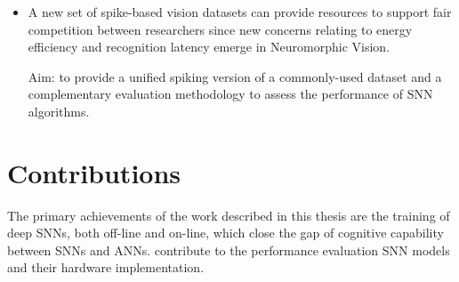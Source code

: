 \begin{itemize}
	\item 
	A new set of spike-based vision datasets can provide resources to support fair competition between researchers since new concerns relating to energy efficiency and recognition latency emerge in Neuromorphic Vision.

	Aim: to provide a unified spiking version of a commonly-used dataset and a complementary evaluation methodology to assess the performance of SNN algorithms.
\end{itemize}


\section{Contributions}
The primary achievements of the work described in this thesis are the training of deep SNNs, both off-line and on-line, which close the gap of cognitive capability between SNNs and ANNs.
\DIFdelbegin {}\DIFdelend \DIFaddbegin {}\DIFaddend contribute to the performance evaluation \DIFdelbegin {}\DIFdelend \DIFaddbegin {}\DIFaddend SNN models and their hardware implementation.
